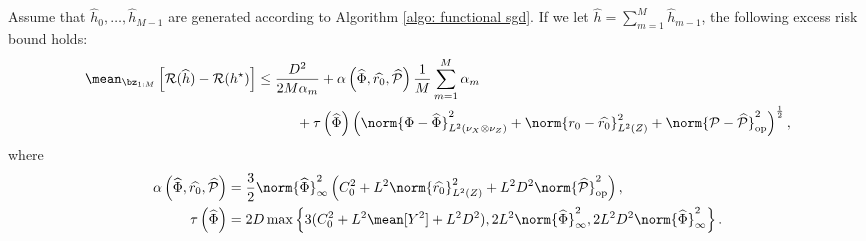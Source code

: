 \begin{theorem}
    Assume that $ \hat{ h }_{ 0 }, \dots, \hat{ h }_{ M-1 } $ are generated according to Algorithm \ref{algo: functional sgd}.
    If we let $ \hat{ h } = \sum_{ m=1 }^{ M } \hat{ h }_{ m-1 } $, the following excess risk bound holds:
    \begin{align*}
        \begin{split}
            \mean_{ \bz_{ 1:M } } \left[
                \risk ( \hat{ h } ) - \risk ( \hstar )
            \right]
            &\leq \frac{ D^2 }{ 2 M \alpha_{ m } }
            + \alpha \left( \hat{ \Phi }, \hat{ r_{ 0 } }, \hat{ \meanop } \right) \frac{ 1 }{ M } \sum_{ m=1 }^{ M } \alpha_{ m } \\
            &\hspace{1cm}
            + \tau \left( \hat{ \Phi } \right) \left(
                \norm{ \Phi - \hat{ \Phi } }_{ L^{ 2 } ( \nu_{ X } \otimes \nu_{ Z } ) }^2 + \norm{ r_{ 0 } - \hat{ r_{ 0 } } }_{ L^2 ( Z ) }^2 + \norm{ \meanop - \hat{ \meanop } }_{ \op }^2
            \right)^{ \frac{ 1 }{ 2 } },
        \end{split}
    \end{align*}
    where
    \begin{align*}
        \alpha \left( \hat{ \Phi }, \hat{ r_{ 0 } }, \hat{ \meanop } \right)
        &= \frac{ 3 }{ 2 } \norm{ \hat{ \Phi } }_{ \infty }^2 \left(
            C_{ 0 }^2 + L^2 \norm{ \hat{ r_{ 0 } } }_{ L^2 ( Z ) }^2 + L^2 D ^2 \norm{ \hat{ \meanop } }_{ \op }^2
        \right), \\
        \tau \left( \hat{ \Phi } \right)
        &= 2 D \max \left\{
            3 ( C_{ 0 }^2 + L^2 \mean [ Y^2 ] + L^2 D^2 ),
            2L^2 \norm{ \hat{ \Phi } }_{ \infty }^2,
            2L^2 D^2 \norm{ \hat{ \Phi } }_{ \infty }^2
        \right\}
    .\end{align*}
\end{theorem}
